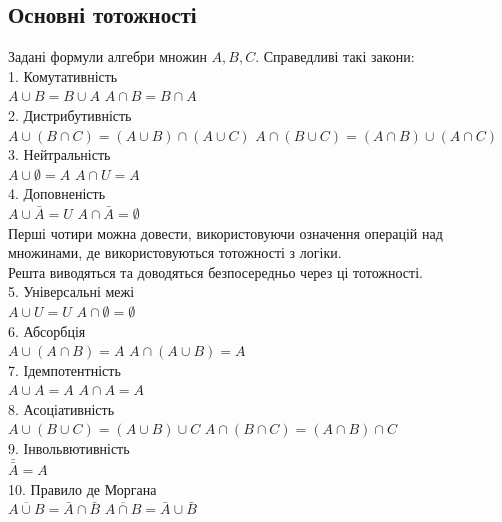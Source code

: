 \documentclass[a4paper, 14pt]{extarticle}
\theoremstyle{theoremdd}
\theoremstyle{theoremdd}
\theoremstyle{theoremdd}
\theoremstyle{theoremdd}
\theoremstyle{theoremdd}
\theoremstyle{theoremdd}
\theoremstyle{theoremdd}
\theoremstyle{theoremdd}
\theoremstyle{theoremdd}
\theoremstyle{theoremdd}
\theoremstyle{theoremdd}
\theoremstyle{theoremdd}
\theoremstyle{theoremdd}
\theoremstyle{theoremdd}
\theoremstyle{theoremdd}
\begin{document}
\subsection{Основні тотожності}
Задані формули алгебри множин $A,B,C$. Справедливі такі закони:\\
1. Комутативність\\
$A \cup B = B \cup A$ \hspace{5cm} $A \cap B = B \cap A$\\
2. Дистрибутивність\\
$A \cup (B \cap C) = (A \cup B) \cap (A \cup C)$ \hspace{1cm} $A \cap (B \cup C) = (A \cap B) \cup (A \cap C)$\\
3. Нейтральність\\
$A \cup \emptyset = A$ \hspace{6cm} $A \cap U = A$\\
4. Доповненість\\
$A \cup \bar{A} = U$ \hspace{5.8cm} $A \cap \bar{A} = \emptyset$\\
Перші чотири можна довести, використовуючи означення операцій над множинами, де використовуються тотожності з логіки. \\
Решта виводяться та доводяться безпосередньо через ці тотожності.
\bigskip \\
5. Універсальні межі\\
$A \cup U = U$ \hspace{5.8cm} $A \cap \emptyset = \emptyset$\\
6. Абсорбція\\
$A \cup (A \cap B) = A$ \hspace{4.4cm} $A \cap (A \cup B) = A$\\
7. Ідемпотентність\\
$A \cup A = A$ \hspace{5.7cm} $A \cap A = A$\\
8. Асоціативність\\
$A \cup (B \cup C) = (A \cup B) \cup C$ \hspace{2cm} $A \cap (B \cap C) = (A \cap B) \cap C$\\
9. Інвольвютивність\\
$\bar{\bar{A}} = A$\\
10. Правило де Моргана\\
$\overline{A \cup B} = \bar{A} \cap \bar{B}$ \hspace{4.7cm} $\overline{A \cap B} = \bar{A} \cup \bar{B}$
\end{document}
